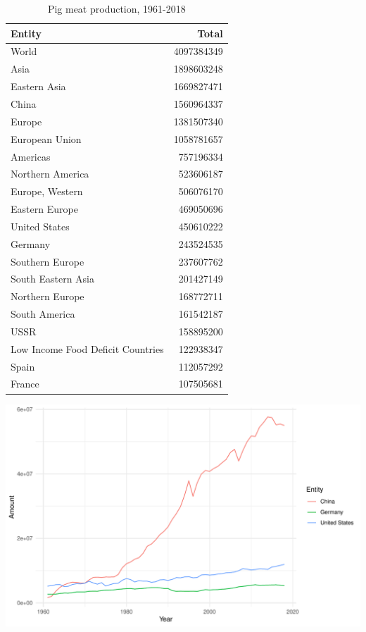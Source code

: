 \documentclass[11pt,a4paper,]{article}
\begin{document}
\begin{table}

\caption{\label{tab:pig}Pig meat production, 1961-2018}
\centering
\begin{tabular}[t]{lr}
\toprule
Entity & Total\\
\midrule
World & 4097384349\\
Asia & 1898603248\\
Eastern Asia & 1669827471\\
China & 1560964337\\
Europe & 1381507340\\
\addlinespace
European Union & 1058781657\\
Americas & 757196334\\
Northern America & 523606187\\
Europe, Western & 506076170\\
Eastern Europe & 469050696\\
\addlinespace
United States & 450610222\\
Germany & 243524535\\
Southern Europe & 237607762\\
South Eastern Asia & 201427149\\
Northern Europe & 168772711\\
\addlinespace
South America & 161542187\\
USSR & 158895200\\
Low Income Food Deficit Countries & 122938347\\
Spain & 112057292\\
France & 107505681\\
\bottomrule
\end{tabular}
\end{table}

\includegraphics{report_files/figure-latex/pig-1.pdf}
\end{document}

